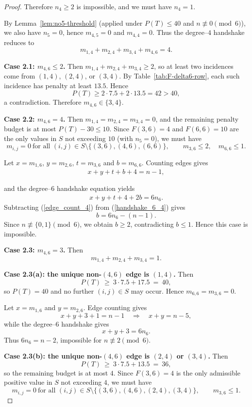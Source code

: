 \documentclass[10pt,a4paper]{amsart}
\begin{document}
\begin{proof}
Therefore $n_4\ge 2$ is impossible, and we must have $n_4=1$.

By Lemma~\ref{lem:no5-threshold} (applied under $P(T)\le 40$ and
$n\not\equiv 0\pmod 6$), we also have $n_5=0$, hence $m_{4,5}=0$ and $m_{4,4}=0$.
Thus the degree--$4$ handshake reduces to
\[
m_{1,4}+m_{2,4}+m_{3,4}+m_{4,6}=4 .
\]


\medskip
\noindent\textbf{Case 2.1: $m_{4,6}\le 2$.}
Then $m_{1,4}+m_{2,4}+m_{3,4}\ge 2$, so at least two incidences come from
$(1,4)$, $(2,4)$, or $(3,4)$.
By Table~\ref{tab:F-delta6-row}, each such incidence has penalty at least $13.5$.
Hence
\[
P(T)\ge 2\cdot 7.5+2\cdot 13.5=42>40,
\]
a contradiction. Therefore $m_{4,6}\in\{3,4\}$.


\medskip
\noindent
\textbf{Case 2.2: $m_{4,6}=4$.}  
Then $m_{1,4}=m_{2,4}=m_{3,4}=0$, and the remaining penalty budget is at most
$P(T)-30\le 10$.  
Since $F(3,6)=4$ and $F(6,6)=10$ are the only values in $S$ not exceeding $10$
(with $n_5=0$), we must have
\[
m_{i,j}=0 \ \text{for all }(i,j)\in S\setminus\{(3,6),(4,6),(6,6)\}, \qquad
m_{3,6}\le 2, \quad m_{6,6}\le 1 .
\]

Let $x=m_{1,6}$, $y=m_{2,6}$, $t=m_{3,6}$ and $b=m_{6,6}$.  
Counting edges gives
\begin{eqnarray}
\label{edge_count_4}
  x+y+t+b+4=n-1 ,  
\end{eqnarray}

and the degree--$6$ handshake equation yields
\begin{eqnarray}
\label{handshake_6_4}
x+y+t+4+2b=6n_6 .
\end{eqnarray}
Subtracting (\ref{edge_count_4}) from (\ref{handshake_6_4}) gives
\[
b=6n_6-(n-1) .
\]
Since $n\not\equiv\{0,1\}\pmod 6$, we obtain $b\ge 2$, contradicting $b\le 1$.
Hence this case is impossible.

\medskip
\noindent
\textbf{Case 2.3: $m_{4,6}=3$.}  
Then
\[
m_{1,4}+m_{2,4}+m_{3,4}=1 .
\]

\smallskip
\noindent
\textbf{Case 2.3(a): the unique non-$(4,6)$ edge is $(1,4)$.}  
Then
\[
P(T)\ \ge\ 3\cdot 7.5 + 17.5 \ =\ 40 ,
\]
so $P(T)=40$ and no further $(i,j)\in S$ may occur.  
Hence $m_{6,6}=m_{3,6}=0$.

Let $x=m_{1,6}$ and $y=m_{2,6}$.  
Edge counting gives
\[
x+y+3+1=n-1 \quad\Rightarrow\quad x+y=n-5 ,
\]
while the degree--$6$ handshake gives
\[
x+y+3=6n_6 .
\]
Thus $6n_6=n-2$, impossible for $n\not\equiv 2\pmod 6$.

\smallskip
\noindent
\textbf{Case 2.3(b): the unique non-$(4,6)$ edge is $(2,4)$ or $(3,4)$.}  
Then
\[
P(T)\ \ge\ 3\cdot 7.5 + 13.5 \ =\ 36 ,
\]
so the remaining budget is at most $4$.  
Since $F(3,6)=4$ is the only admissible positive value in $S$ not exceeding $4$,
we must have
\[
m_{i,j}=0 \ \text{for all }(i,j)\in S\setminus\{(3,6),(4,6),(2,4),(3,4)\},
\qquad m_{3,6}\le 1 .
\]


\end{proof}
\end{document}
